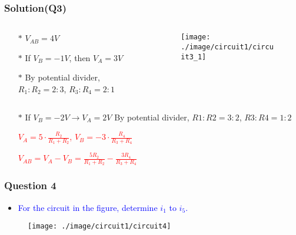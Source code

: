 \documentclass{beamer}
\newcommand{\blue}[1]{\textcolor{blue}{#1}}
\newcommand{\red}[1]{\textcolor{red}{#1}}
\begin{document}
\begin{frame}
\frametitle{Solution(Q3)}

\begin{columns}
\begin{column}{6cm}
\begin{itemize} \itemsep1pt \parskip0pt 
  \item[$\ast$] $V_{AB} = 4V$
  \item[$\ast$] If $V_B = -1V$, \newline then $V_A = 3V$
  \item[$\ast$] By potential divider, $R_1:R_2 = 2:3$, $R_3:R_4 = 2:1$
\end{itemize}
\end{column}

\begin{column}{6cm}
\begin{figure}[H]
  \label{epi_circuit3_1_1}
  \centering
  \texttt{[image: ./image/circuit1/circuit3\_1]}
\end{figure}
\end{column}
\end{columns}


\begin{itemize} \itemsep1pt \parskip0pt 
  \item[$\ast$] If $V_B = -2V \rightarrow V_A = 2V$\newline
  By potential divider,\newline
  $R1:R2 = 3:2$, $R3:R4 = 1:2$
\end{itemize}


\begin{itemize} \itemsep1pt \parskip0pt 
  \item[] \red{$V_A = 5\cdot \frac{R_2}{R_1+R_2}$, $V_B = -3\cdot \frac{R_4}{R_3+R_4}$}
  \item[] \red{$V_{AB} = V_A - V_B = \frac{5R_2}{R_1+R_2}-\frac{3R_4}{R_3+R_4}$}
\end{itemize}


\end{frame}


\begin{frame}
\frametitle{Question 4}

\begin{itemize} \itemsep1pt \parskip0pt 
  \item \blue{For the circuit in the figure, determine $i_1$ to $i_5$.}
\end{itemize}



\begin{figure}[H]
  \centering
  \texttt{[image: ./image/circuit1/circuit4]}
\end{figure}


\end{frame}
\end{document}
